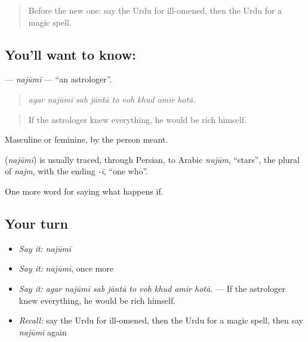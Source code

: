 \label{lesson:UR-C535-najumi}



\begin{quote}
Before the new one: say the Urdu for ill-omened, then the Urdu for a magic spell.
\end{quote}

\subsection*{You'll want to know: }
\textbf{} — \emph{najūmī} — \textquotedblleft{}an astrologer\textquotedblright{}.

\begin{quote}
        
\end{quote}

\begin{quote}
\emph{agar najūmī sab jāntā to voh khud amīr hotā.}
\end{quote}

\begin{quote}
If the astrologer knew everything, he would be rich himself.
\end{quote}

Masculine or feminine, by the person meant.

\begin{cousinweb}
\textbf{} (\emph{najūmī}) is usually traced, through Persian, to Arabic \emph{nujūm}, \textquotedblleft{}stars\textquotedblright{}, the plural of \emph{najm}, with the ending \emph{-ī}, \textquotedblleft{}one who\textquotedblright{}.
\end{cousinweb}

\begin{grammarlens}[title={What you've built}]
One more word for saying what happens if.
\end{grammarlens}

\subsection*{Your turn}
\begin{itemize}
\raggedright
  \item \emph{Say it:} \emph{najūmī}
  \item \emph{Say it:} \emph{najūmī}, once more
  \item \emph{Say it:} \emph{agar najūmī sab jāntā to voh khud amīr hotā.} — If the astrologer knew everything, he would be rich himself.
  \item \emph{Recall:} say the Urdu for ill-omened, then the Urdu for a magic spell, then say \emph{najūmī} again
\end{itemize}

